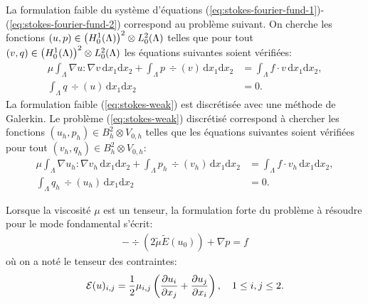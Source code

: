La formulation faible du système d'équations
(\ref{eq:stokes-fourier-fund-1})-(\ref{eq:stokes-fourier-fund-2})
correspond au problème suivant. On cherche les fonctions
$(u,p)\in\left( H_0^1(\Lambda) \right)^2\otimes L_0^2(\Lambda)$ telles que
pour tout $(v, q)\in \left( H_0^1(\Lambda) \right)^2\otimes L_0^2(\Lambda)$
les équations suivantes soient vérifiées:
\begin{equation}\label{eq:stokes-weak}
  \begin{aligned}
    \mu \int_\Lambda \nabla u: \nabla v\,\mathrm dx_1\mathrm dx_2 +
    \int_\Lambda p\,\div(v)\,\mathrm dx_1\mathrm dx_2 &= \int_\Lambda
    f\cdot v\,\mathrm dx_1\mathrm dx_2,\\
    \int_\Lambda q\,\div(u)\,\mathrm dx_1\mathrm dx_2 &= 0.
  \end{aligned}
\end{equation}
La formulation faible (\ref{eq:stokes-weak}) est discrétisée avec
une méthode de Galerkin. Le problème (\ref{eq:stokes-weak})
discrétisé correspond à chercher les fonctions $(u_h,p_h)\in
B_{h}^2\otimes V_{0,h}$ telles que les équations suivantes soient
vérifiées pour tout $(v_h, q_h) \in B_{h}^2\otimes V_{0,h}$:
\begin{equation}\label{eq:stokes-discr-weak}
  \begin{aligned}
    \mu \int_\Lambda \nabla u_h: \nabla v_h\,\mathrm dx_1\mathrm dx_2 +
    \int_\Lambda p_h\,\div(v_h)\,\mathrm dx_1\mathrm dx_2 &= \int_\Lambda
    f\cdot v_h\,\mathrm dx_1\mathrm dx_2,\\
    \int_\Lambda q_h\,\div(u_h)\,\mathrm dx_1\mathrm dx_2 &= 0.
  \end{aligned}
\end{equation}

Lorsque la viscosité $\mu$ est un tenseur, la formulation forte du
problème à résoudre pour le mode fondamental s'écrit:
\begin{equation}
  \begin{aligned}
    -\div(2\tilde\mu\tilde E(u_0)) + \nabla p = f
  \end{aligned}
\end{equation}
où on a noté le tenseur des contraintes:
\begin{equation}
  \mathcal E(u)_{i,j} = \frac{1}{2}\mu_{i,j}\left( \frac{\partial
      u_i}{\partial x_j} + \frac{\partial u_j}{\partial x_i} \right), \quad
  1\leq i,j\leq 2.
\end{equation}

